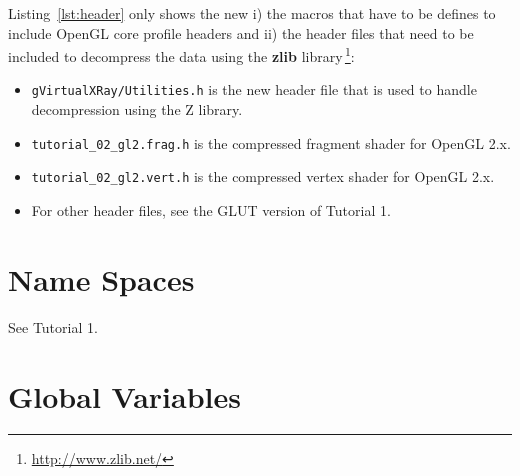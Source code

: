 \documentclass[11pt,oneside,a4paper,final]{article}
\begin{document}
Listing~\ref{lst:header} only shows the new i) the macros that have to be defines to include 
OpenGL core profile headers and ii) the header files that need to be included to decompress the data using the \textbf{zlib} library\,\footnote{\url{http://www.zlib.net/}}:
\begin{itemize}
 \item \verb+gVirtualXRay/Utilities.h+ is the new header file that is used to handle decompression using the Z library. 
 \item \verb+tutorial_02_gl2.frag.h+ is the compressed fragment shader for OpenGL 2.x. 
 \item \verb+tutorial_02_gl2.vert.h+ is the compressed vertex shader for OpenGL 2.x. 
 \item For other header files, see the GLUT version of Tutorial 1.
\end{itemize}

\begin{center}

\end{center}


\section{Name Spaces}
\label{sec:Name Spaces}

See Tutorial 1.


\section{Global Variables}
\label{sec:Global Variables}
\end{document}
